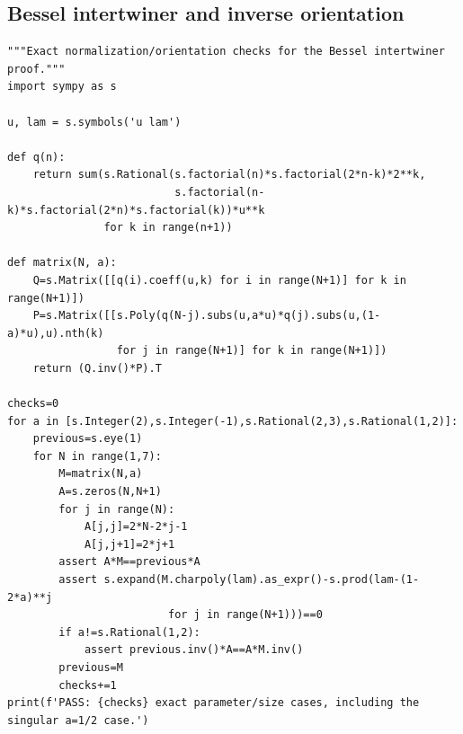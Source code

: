 \documentclass[11pt,a4paper]{article}
\theoremstyle{definition}
\theoremstyle{remark}
\numberwithin{equation}{section}
\begin{document}
\subsection{Bessel intertwiner and inverse orientation}


\begin{lstlisting}
"""Exact normalization/orientation checks for the Bessel intertwiner proof."""
import sympy as s

u, lam = s.symbols('u lam')

def q(n):
    return sum(s.Rational(s.factorial(n)*s.factorial(2*n-k)*2**k,
                          s.factorial(n-k)*s.factorial(2*n)*s.factorial(k))*u**k
               for k in range(n+1))

def matrix(N, a):
    Q=s.Matrix([[q(i).coeff(u,k) for i in range(N+1)] for k in range(N+1)])
    P=s.Matrix([[s.Poly(q(N-j).subs(u,a*u)*q(j).subs(u,(1-a)*u),u).nth(k)
                 for j in range(N+1)] for k in range(N+1)])
    return (Q.inv()*P).T

checks=0
for a in [s.Integer(2),s.Integer(-1),s.Rational(2,3),s.Rational(1,2)]:
    previous=s.eye(1)
    for N in range(1,7):
        M=matrix(N,a)
        A=s.zeros(N,N+1)
        for j in range(N):
            A[j,j]=2*N-2*j-1
            A[j,j+1]=2*j+1
        assert A*M==previous*A
        assert s.expand(M.charpoly(lam).as_expr()-s.prod(lam-(1-2*a)**j
                         for j in range(N+1)))==0
        if a!=s.Rational(1,2):
            assert previous.inv()*A==A*M.inv()
        previous=M
        checks+=1
print(f'PASS: {checks} exact parameter/size cases, including the singular a=1/2 case.')
\end{lstlisting}
\end{document}
